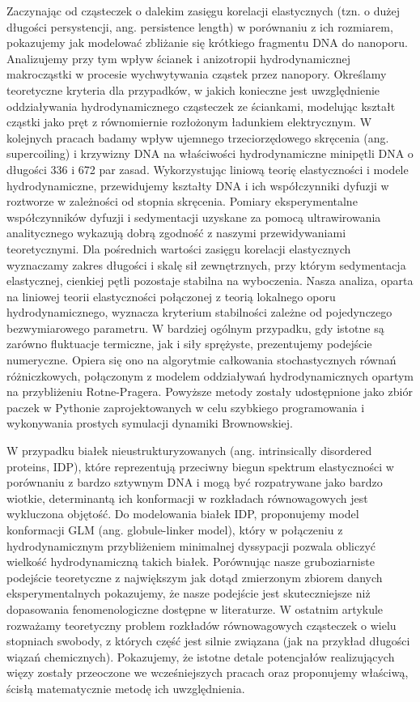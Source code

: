 Zaczynając od cząsteczek o dalekim zasięgu korelacji elastycznych (tzn. o dużej długości persystencji, ang. persistence length) w porównaniu z ich rozmiarem, pokazujemy jak modelować zbliżanie się krótkiego fragmentu DNA do nanoporu. Analizujemy przy tym wpływ ścianek i anizotropii hydrodynamicznej makrocząstki w procesie wychwytywania cząstek przez nanopory.
Określamy teoretyczne kryteria dla przypadków, w jakich konieczne jest uwzględnienie oddziaływania hydrodynamicznego cząsteczek ze ściankami, modelując kształt cząstki jako pręt z równomiernie rozłożonym ładunkiem elektrycznym.
W kolejnych pracach badamy wpływ ujemnego trzeciorzędowego skręcenia (ang. supercoiling) i krzywizny DNA na właściwości hydrodynamiczne minipętli DNA o długości 336 i 672 par zasad.
Wykorzystując liniową teorię elastyczności i modele hydrodynamiczne, przewidujemy kształty DNA i ich współczynniki dyfuzji w roztworze w zależności od stopnia skręcenia. 
Pomiary eksperymentalne współczynników dyfuzji i sedymentacji uzyskane za pomocą ultrawirowania analitycznego wykazują dobrą zgodność z naszymi przewidywaniami teoretycznymi. Dla pośrednich wartości zasięgu korelacji elastycznych wyznaczamy zakres długości i skalę sił zewnętrznych, przy którym sedymentacja elastycznej, cienkiej pętli pozostaje stabilna na wyboczenia.
Nasza analiza, oparta na liniowej teorii elastyczności połączonej z teorią lokalnego oporu hydrodynamicznego, wyznacza kryterium stabilności zależne od pojedynczego bezwymiarowego parametru. W bardziej ogólnym przypadku, gdy istotne są zarówno fluktuacje termiczne, jak i siły sprężyste, prezentujemy podejście numeryczne. Opiera się ono na algorytmie całkowania stochastycznych równań różniczkowych, połączonym z modelem oddziaływań hydrodynamicznych opartym na przybliżeniu Rotne-Pragera. Powyższe metody zostały udostępnione jako zbiór paczek w Pythonie zaprojektowanych w celu szybkiego programowania i wykonywania prostych symulacji dynamiki Brownowskiej.

W przypadku białek nieustrukturyzowanych (ang. intrinsically disordered proteins, IDP), które reprezentują przeciwny biegun spektrum elastyczności w porównaniu z bardzo sztywnym DNA i mogą być rozpatrywane jako bardzo wiotkie, determinantą ich konformacji w rozkładach równowagowych jest wykluczona objętość. 
Do modelowania białek IDP, proponujemy model konformacji GLM (ang. globule-linker model), który w połączeniu z hydrodynamicznym przybliżeniem minimalnej dyssypacji pozwala obliczyć wielkość hydrodynamiczną takich białek.
Porównując nasze gruboziarniste podejście teoretyczne z największym jak dotąd zmierzonym zbiorem danych eksperymentalnych pokazujemy, że nasze podejście jest skuteczniejsze niż dopasowania fenomenologiczne dostępne w literaturze. W ostatnim artykule rozważamy teoretyczny problem rozkładów równowagowych cząsteczek o wielu stopniach swobody, z których część jest silnie związana (jak na przykład długości wiązań chemicznych).
Pokazujemy, że istotne detale potencjałów realizujących więzy zostały przeoczone we wcześniejszych pracach oraz proponujemy właściwą, ścisłą matematycznie metodę ich uwzględnienia.


